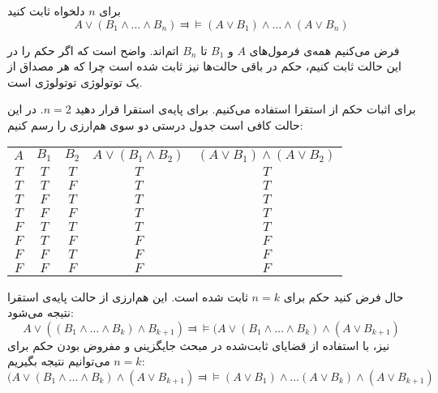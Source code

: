 برای $n$ دلخواه ثابت کنید
$$
A\vee (B_1\wedge\ldots\wedge B_n)\Dashv\vDash(A\vee B_1)\wedge\ldots\wedge(A\vee B_n)
$$
\begin{ans}
فرض می‌کنیم همه‌ی فرمول‌های $A$ و $B_1$ تا $B_n$ اتم‌اند. واضح است که اگر حکم را در این حالت ثابت کنیم، حکم در باقی حالت‌ها نیز ثابت شده است چرا که هر مصداق از یک توتولوژی توتولوژی است.

برای اثبات حکم از استقرا استفاده می‌کنیم. برای پایه‌ی استقرا قرار دهید $n=2$. در این حالت کافی است جدول درستی دو سوی هم‌ارزی را رسم کنیم:

\begin{tabular}{c|c|c|c|c}
$A$ & $B_1$ & $B_2$ & $A\vee(B_1\wedge B_2)$ & $(A\vee B_1)\wedge(A\vee B_2)$ \\
$T$ & $T$ & $T$ & $T$ & $T$ \\
$T$ & $T$ & $F$ & $T$ & $T$ \\
$T$ & $F$ & $T$ & $T$ & $T$ \\
$T$ & $F$ & $F$ & $T$ & $T$ \\
$F$ & $T$ & $T$ & $T$ & $T$ \\
$F$ & $T$ & $F$ & $F$ & $F$ \\
$F$ & $F$ & $T$ & $F$ & $F$ \\
$F$ & $F$ & $F$ & $F$ & $F$ \\
\end{tabular}

حال فرض کنید حکم برای $n=k$ ثابت شده است. این هم‌ارزی از حالت پایه‌ی استقرا نتیجه می‌شود:
$$
A\vee ((B_1\wedge\ldots\wedge B_k)\wedge B_{k+1})\Dashv\vDash (A\vee (B_1\wedge\ldots\wedge B_k)\wedge (A\vee B_{k+1})
$$
نیز، با استفاده از قضایای ثابت‌شده در مبحث جایگزینی و مفروض بودن حکم برای $n=k$ می‌توانیم نتیجه بگیریم:
$$
(A\vee (B_1\wedge\ldots\wedge B_k)\wedge (A\vee B_{k+1})\Dashv\vDash(A\vee B_1)\wedge\ldots(A\vee B_k)\wedge(A\vee B_{k+1})
$$

\end{ans}
